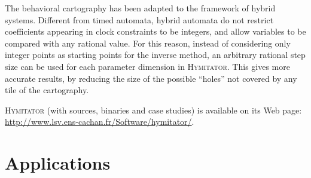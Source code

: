 \documentclass{llncs}
\newcommand{\hymitator}{\textsc{Hymitator}}
\newcommand{\commentaire}[1]{}
\begin{document}

The behavioral cartography has been adapted to the framework of hybrid systems.
Different  from timed automata, hybrid automata do not restrict coefficients appearing in clock constraints to be integers, and allow variables to be compared with any rational value.
For this reason, instead of considering only integer points as starting points for the inverse method, an arbitrary rational step size can be used for each parameter dimension in \hymitator{}.
This gives more accurate results, by reducing the size of the possible ``holes'' not covered by any tile of the cartography.

\hymitator{} (with sources, binaries and case studies) is available on its Web page: \url{http://www.lsv.ens-cachan.fr/Software/hymitator/}.



\section{Applications}
\end{document}
